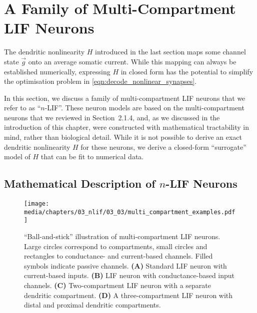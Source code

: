 \section{A Family of Multi-Compartment LIF Neurons}
\label{sec:nlif}

The dendritic nonlinearity $H$ introduced in the last section maps some channel state $\vec g$ onto an average somatic current.
While this mapping can always be established numerically, expressing $H$ in closed form has the potential to simplify the optimisation problem in \cref{eqn:decode_nonlinear_synapses}.

In this section, we discuss a family of multi-compartment LIF neurons that we refer to as \enquote{$n$-LIF}.
These neuron models are based on the multi-compartment neurons that we reviewed in Section~2.1.4, and, as we discussed in the introduction of this chapter, were constructed with mathematical tractability in mind, rather than biological detail.
While it is not possible to derive an exact dendritic nonlinearity $H$ for these neurons, we derive a closed-form \enquote{surrogate} model of $H$ that can be fit to numerical data.

\subsection{Mathematical Description of $n$-LIF Neurons}
\label{sec:nlif_description}

\begin{figure}
	\texttt{[image: media/chapters/03\_nlif/03\_03/multi\_compartment\_examples.pdf]}%
	{\label{fig:nlif_a}}%
	{\label{fig:nlif_b}}%
	{\label{fig:nlif_c}}%
	{\label{fig:nlif_d}}%
	\caption[\enquote{Ball-and-stick} illustration of multi-compartment LIF neurons]{\enquote{Ball-and-stick} illustration of multi-compartment LIF neurons.
	Large circles correspond to compartments, small circles and rectangles to conductance- and current-based channels. Filled symbols indicate passive channels.
	\textbf{(A)} Standard LIF neuron with current-based inputs.
	\textbf{(B)} LIF neuron with conductance-based input channels.
	\textbf{(C)} Two-compartment LIF neuron with a separate dendritic compartment.
	\textbf{(D)} A three-compartment LIF neuron with distal and proximal dendritic compartments.}
	\label{fig:nlif}
\end{figure}

